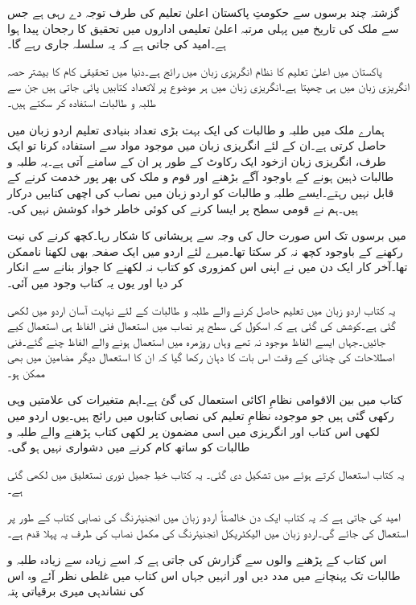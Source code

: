 گزشتہ چند برسوں سے حکومتِ پاکستان اعلیٰ تعلیم کی طرف توجہ دے رہی ہے جس سے ملک کی تاریخ میں پہلی مرتبہ اعلیٰ تعلیمی اداروں میں تحقیق کا رجحان پیدا ہوا ہے۔امید کی جاتی ہے کہ یہ سلسلہ جاری رہے گا۔

پاکستان میں اعلیٰ تعلیم کا نظام انگریزی زبان میں رائج ہے۔دنیا میں تحقیقی کام کا بیشتر حصہ انگریزی زبان میں ہی چھپتا ہے۔انگریزی زبان میں ہر موضوع پر لاتعداد کتابیں پائی جاتی ہیں جن سے طلبہ و طالبات استفادہ  کر سکتے ہیں۔

ہمارے ملک میں طلبہ و طالبات کی ایک بہت بڑی تعداد بنیادی تعلیم اردو زبان میں حاصل کرتی ہے۔ان کے لئے انگریزی زبان میں موجود مواد سے استفادہ  کرنا تو ایک طرف، انگریزی زبان ازخود ایک رکاوٹ کے طور پر ان کے سامنے آتی ہے۔یہ طلبہ و طالبات ذہین ہونے کے باوجود آگے بڑھنے اور قوم و ملک کی بھر پور خدمت کرنے کے قابل نہیں رہتے۔ایسے طلبہ و طالبات کو اردو زبان میں نصاب کی اچھی کتابیں درکار ہیں۔ہم نے قومی سطح پر ایسا کرنے کی کوئی خاطر خواہ کوشش نہیں کی۔ 

میں برسوں تک اس صورت حال کی وجہ سے پریشانی کا شکار رہا۔کچھ کرنے کی نیت رکھنے کے باوجود کچھ نہ کر سکتا تھا۔میرے لئے اردو میں ایک صفحہ بھی لکھنا ناممکن تھا۔آخر کار ایک دن میں نے اپنی اس کمزوری کو کتاب نہ لکھنے کا جواز بنانے سے انکار کر دیا اور یوں یہ کتاب وجود میں آئی۔

یہ کتاب اردو زبان میں تعلیم حاصل کرنے والے طلبہ و طالبات کے لئے نہایت آسان اردو میں لکھی گئی ہے۔کوشش کی گئی ہے کہ اسکول کی سطح پر نصاب میں استعمال فنی الفاظ ہی استعمال کیے جائیں۔جہاں ایسے الفاظ موجود نہ تھے وہاں روزمرہ میں استعمال ہونے والے الفاظ چنے گئے۔فنی اصطلاحات کی چنائی کے وقت اس بات کا دہان رکھا گیا کہ ان کا استعمال دیگر مضامین میں بھی ممکن ہو۔

کتاب میں بین الاقوامی نظامِ اکائی استعمال کی گئ ہے۔اہم متغیرات کی علامتیں وہی رکھی گئی ہیں جو موجودہ نظامِ تعلیم کی نصابی کتابوں میں رائج ہیں۔یوں اردو میں لکھی اس کتاب اور انگریزی میں اسی مضمون پر لکھی کتاب پڑھنے والے طلبہ و طالبات کو ساتھ کام کرنے میں دشواری نہیں ہو گی۔ 


یہ کتاب  استعمال کرتے ہوئے  میں تشکیل دی گئی۔ یہ کتاب خطِ جمیل نوری نستعلیق میں لکھی گئی ہے۔

امید کی جاتی ہے کہ یہ کتاب ایک دن خالصتاً اردو زبان میں انجنیئرنگ کی نصابی کتاب کے طور پر استعمال کی جائے گی۔اردو زبان میں الیکٹریکل انجنیئرنگ کی مکمل نصاب کی طرف یہ پہلا قدم ہے۔ 

اس کتاب کے پڑھنے والوں سے گزارش کی جاتی ہے کہ اسے زیادہ سے زیادہ طلبہ و طالبات تک پہنچانے میں مدد دیں اور انہیں جہاں اس کتاب میں غلطی نظر آئے وہ اس کی نشاندہی میری برقیاتی پتہ

